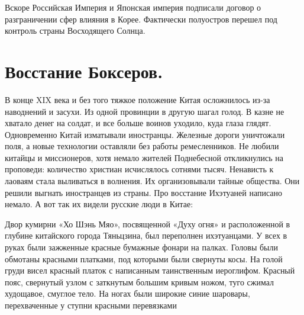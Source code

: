 Вскоре Российская Империя и Японская империя подписали договор о разграничении сфер влияния в Корее. Фактически полуостров перешел под контроль страны Восходящего Солнца.

\section{Восстание Боксеров.}

В конце XIX века и без того тяжкое положение Китая осложнилось из-за наводнений и засухи. Из одной провинции в другую шагал голод. В казне не хватало денег на солдат, и все больше воинов уходило, куда глаза глядят.
Одновременно Китай изматывали иностранцы. Железные дороги уничтожали поля, а новые технологии оставляли без работы ремесленников. Не любили китайцы и миссионеров, хотя немало жителей Поднебесной откликнулись на проповеди: количество христиан исчислялось сотнями тысяч.
Ненависть к лаоваям стала выливаться в волнения. Их организовывали тайные общества. Они решили выгнать иностранцев из страны.
Про восстание Ихэтуаней написано немало. А вот так их видели русские люди в Китае:

\begin{textcitation}
Двор кумирни «Хо Шэнь Мяо», посвященной «Духу огня» и расположенной в глубине китайского города Тяньцзина, был переполнен ихэтуанцами.
У всех в руках были зажженные красные бумажные фонари на палках. Головы были обмотаны красными платками, под которыми были свернуты косы. На голой груди висел красный платок с написанным таинственным иероглифом. Красный пояс, свернутый узлом с заткнутым большим кривым ножом, туго сжимал худощавое, смуглое тело. На ногах были широкие синие шаровары, перехваченные у ступни красными перевязками
\end{textcitation}

